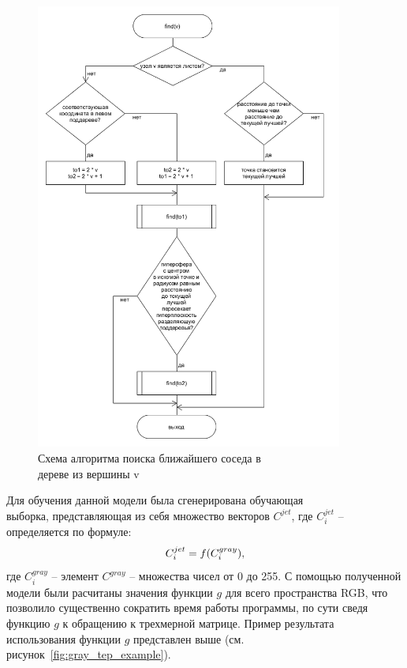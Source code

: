 \documentclass[14pt, a4paper]{extreport}
\begin{document}
	\begin{figure}[h!]
		\centering
		\includegraphics[width = 0.9\textwidth]{image/chapter_2/kdtreealgo}	
		\caption{Схема алгоритма поиска ближайшего соседа в \\ дереве из вершины v}
		\label{fig:kdtreealgo}
	\end{figure}
	
	Для обучения данной модели была сгенерирована обучающая \\ выборка, представляющая из себя множество векторов $C^{jet}$, где $C^{jet}_{i}$ -- определяется по формуле:
	\vspace*{-0.3cm}
	\begin{equation}
		C^{jet}_{i} = f(C^{gray}_{i}),
		\label{eq:Cjetgray}
		\vspace*{-0.35cm}
	\end{equation}
	где $C^{gray}_{i}$ -- элемент $C^{gray}$ -- множества чисел от 0 до 255. С помощью полученной модели были расчитаны значения функции $g$ для всего пространства RGB, что позволило существенно сократить время работы программы, по сути сведя функцию $g$ к обращению к трехмерной матрице. Пример результата использования функции $g$ представлен выше (см. рисунок~\ref{fig:gray_tep_example}).
	
\end{document}
